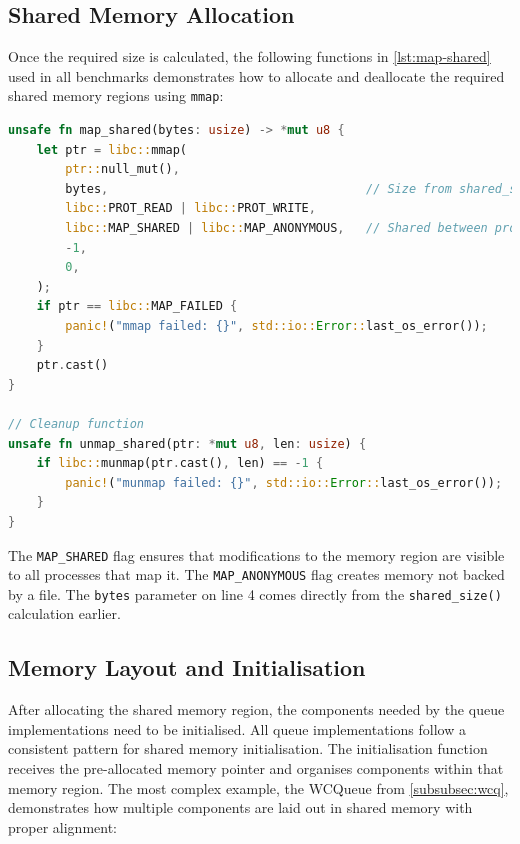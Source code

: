 \subsection{Shared Memory Allocation}

Once the required size is calculated, the following functions in \cref{lst:map-shared} used in all benchmarks demonstrates how to allocate and deallocate the required shared memory regions using \texttt{mmap}:

\begin{lstlisting}[language=Rust, style=boxed, caption={Shared memory allocation using mmap}, label={lst:map-shared}]
unsafe fn map_shared(bytes: usize) -> *mut u8 {
    let ptr = libc::mmap(
        ptr::null_mut(),
        bytes,                                    // Size from shared_size()
        libc::PROT_READ | libc::PROT_WRITE,
        libc::MAP_SHARED | libc::MAP_ANONYMOUS,   // Shared between processes
        -1,
        0,
    );
    if ptr == libc::MAP_FAILED {
        panic!("mmap failed: {}", std::io::Error::last_os_error());
    }
    ptr.cast()
}

// Cleanup function
unsafe fn unmap_shared(ptr: *mut u8, len: usize) {
    if libc::munmap(ptr.cast(), len) == -1 {
        panic!("munmap failed: {}", std::io::Error::last_os_error());
    }
}
\end{lstlisting}

The \texttt{MAP\_SHARED} flag ensures that modifications to the memory region are visible to all processes that map it. The \texttt{MAP\_ANONYMOUS} flag creates memory not backed by a file. The \texttt{bytes} parameter on line 4 comes directly from the \texttt{shared\_size()} calculation earlier.

\subsection{Memory Layout and Initialisation}

After allocating the shared memory region, the components needed by the queue implementations need to be initialised. All queue implementations follow a consistent pattern for shared memory initialisation. The initialisation function receives the pre-allocated memory pointer and organises components within that memory region. The most complex example, the WCQueue from \cref{subsubsec:wcq}, demonstrates how multiple components are laid out in shared memory with proper alignment:

